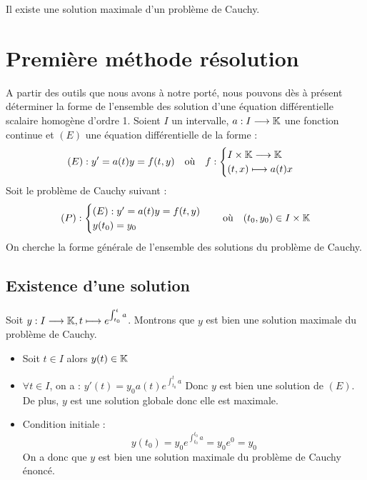 \begin{theorem}
    Il existe une solution maximale d'un problème de Cauchy. 
\end{theorem}


\section{Première méthode résolution}

A partir des outils que nous avons à notre porté, nous pouvons dès à présent déterminer la forme de l'ensemble des solution 
d'une équation différentielle scalaire homogène d'ordre 1. Soient $I$ un intervalle, $a : I \longrightarrow \mathbb{K}$ une fonction continue 
et $(E)$ une équation différentielle de la forme : 
    \[ (E) : y' = a(t)y = f(t,y) \quad \text{où} \quad f : 
        \begin{cases}
            I \times \mathbb{K} \longrightarrow \mathbb{K} \\ 
            (t,x) \longmapsto a(t)x
        \end{cases}
    \]
Soit le problème de Cauchy suivant : 
    \[ (P) : 
        \begin{cases}
            (E) : y' = a(t)y = f(t,y) \\ 
            y(t_0) = y_0
        \end{cases}
        \quad \text{où} \quad (t_0,y_0) \in I \times \mathbb{K} \] 
On cherche la forme générale de l'ensemble des solutions du problème de Cauchy. 

\subsection{Existence d'une solution}

Soit $y : I \longrightarrow \mathbb{K}, t \longmapsto e^{ \int_{t_0}^{t} a}$. Montrons que $y$ est bien une solution maximale du 
problème de Cauchy. 
\begin{itemize}
    \item Soit $t \in I$ alors $y(t) \in \mathbb{K}$ 
    \item $ \forall t \in I$, on a : $y'(t) = y_0 a(t) e^{ \int_{t_0}^{t} a}$ 
    Donc $y$ est bien une solution de $(E)$. De plus, $y$ est une solution globale donc elle est maximale. 
    \item Condition initiale : 
        \[ y(t_0) = y_0 e^{ \int_{t_0}^{t_0} a} = y_0 e^0 = y_0 \] 
    On a donc que $y$ est bien une solution maximale du problème de Cauchy énoncé. 
\end{itemize}

